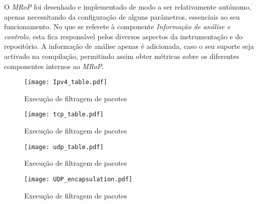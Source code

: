 O \textit{MRoP} foi desenhado e implementado de modo a ser relativamente autónomo, apenas necessitando da configuração de alguns parâmetros, essenciais ao seu funcionamento.
No que se referete à componente \textit{Informação de análise e controlo}, esta fica responsável pelos diversos aspectos da instrumentação e do repositório.
A informação de análise apenas é adicionada, caso o seu suporte seja activado na compilação, permitindo assim obter métricas sobre os diferentes componentes internos ao \textit{MRoP}.

\begin{figure}[ht]
\centering
\texttt{[image: Ipv4\_table.pdf]}
\caption{Execução de filtragem de pacotes}
\label{fig:run_filter}
\end{figure}


\begin{figure}[ht]
\centering
\texttt{[image: tcp\_table.pdf]}
\caption{Execução de filtragem de pacotes}
\label{fig:run_filter}
\end{figure}

\begin{figure}[ht]
\centering
\texttt{[image: udp\_table.pdf]}
\caption{Execução de filtragem de pacotes}
\label{fig:run_filter}
\end{figure}


\begin{figure}[ht]
\centering
\texttt{[image: UDP\_encapsulation.pdf]}
\caption{Execução de filtragem de pacotes}
\label{fig:run_filter}
\end{figure}





